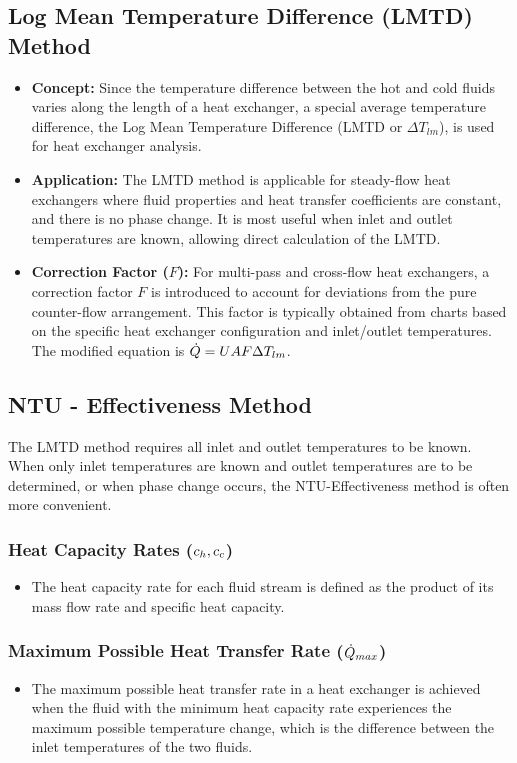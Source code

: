 \subsection{Log Mean Temperature Difference (LMTD) Method}
\begin{itemize}
    \item \textbf{Concept:} Since the temperature difference between the hot and cold fluids varies along the length of a heat exchanger, a special average temperature difference, the Log Mean Temperature Difference (LMTD or $\Delta T_{lm}$), is used for heat exchanger analysis.
    \item \textbf{Application:} The LMTD method is applicable for steady-flow heat exchangers where fluid properties and heat transfer coefficients are constant, and there is no phase change. It is most useful when inlet and outlet temperatures are known, allowing direct calculation of the LMTD.
    \item \textbf{Correction Factor ($F$):} For multi-pass and cross-flow heat exchangers, a correction factor $F$ is introduced to account for deviations from the pure counter-flow arrangement. This factor is typically obtained from charts based on the specific heat exchanger configuration and inlet/outlet temperatures. The modified equation is $\dot{Q} = U A F \Delta T_{lm}$.
\end{itemize}

\subsection{NTU - Effectiveness Method}
The LMTD method requires all inlet and outlet temperatures to be known. When only inlet temperatures are known and outlet temperatures are to be determined, or when phase change occurs, the NTU-Effectiveness method is often more convenient.
\subsubsection*{Heat Capacity Rates ($c_h, c_c$)}
\begin{itemize}
    \item The heat capacity rate for each fluid stream is defined as the product of its mass flow rate and specific heat capacity.
\end{itemize}
\subsubsection*{Maximum Possible Heat Transfer Rate ($\dot{Q}_{max}$)}
\begin{itemize}
    \item The maximum possible heat transfer rate in a heat exchanger is achieved when the fluid with the minimum heat capacity rate experiences the maximum possible temperature change, which is the difference between the inlet temperatures of the two fluids.
\end{itemize}
